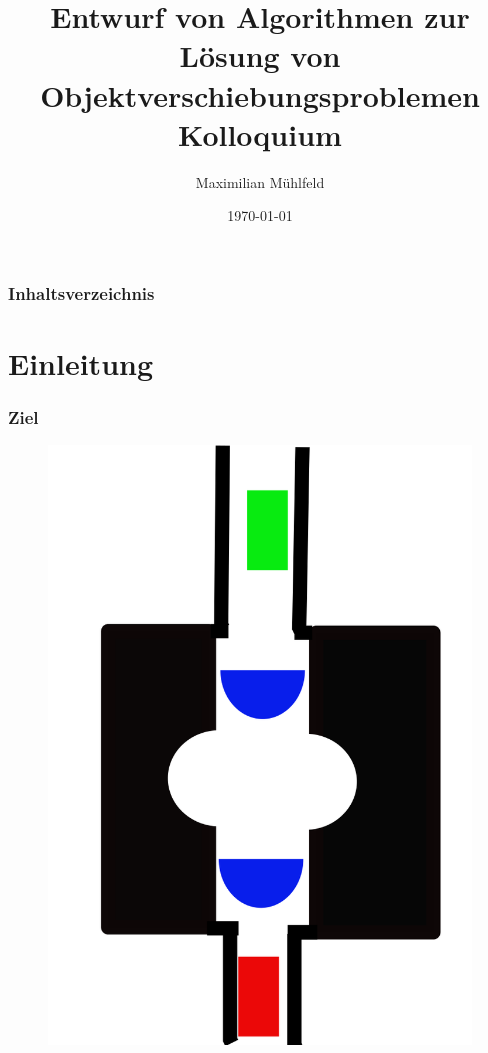 \documentclass[final]{beamer}
\title[Masterarbeit - Kolloquium]{Entwurf von Algorithmen zur Lösung von Objektverschiebungsproblemen \\ \small Kolloquium}
\author{Maximilian Mühlfeld}
\date{\today}
\begin{document}
\begin{frame}
\titlepage
\end{frame} 

\begin{frame}
\frametitle{Inhaltsverzeichnis}
\scriptsize
\tableofcontents
\end{frame} 


\section{Einleitung} 
\begin{frame}
\frametitle{Ziel}
\begin{figure}
\includegraphics[scale=0.1]{../thesis/mixedriddle}

\end{figure}
\end{frame}
\end{document}
